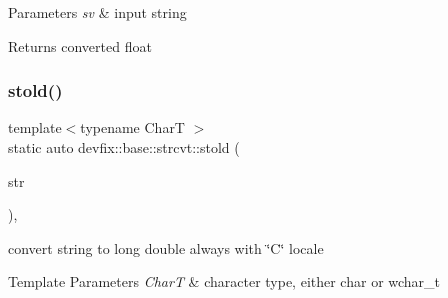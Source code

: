 \begin{DoxyParams}{Parameters}
{\em sv} & input string \\
\hline
\end{DoxyParams}
\begin{DoxyReturn}{Returns}
converted float 
\end{DoxyReturn}
\mbox{\label{structdevfix_1_1base_1_1strcvt_a387c5ad278f568abb921df0ebac489c3}} 
\subsubsection{\texorpdfstring{stold()}{stold()}\hspace{0.1cm}{\footnotesize\ttfamily [1/2]}}
{\footnotesize\ttfamily template$<$typename CharT $>$ \\
static auto devfix\+::base\+::strcvt\+::stold (\begin{DoxyParamCaption}\item[{const std\+::basic\+\_\+string$<$ CharT $>$ \&}]{str }\end{DoxyParamCaption})\hspace{0.3cm}{\ttfamily [inline]}, {\ttfamily [static]}}



convert string to long double always with \char`\"{}\+C\char`\"{} locale 


\begin{DoxyTemplParams}{Template Parameters}
{\em CharT} & character type, either \textquotesingle{}char\textquotesingle{} or \textquotesingle{}wchar\+\_\+t\textquotesingle{} \\
\hline
\end{DoxyTemplParams}

